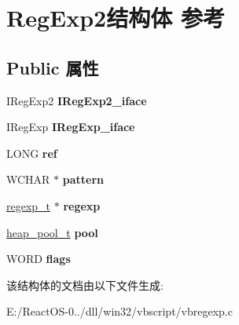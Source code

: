 \hypertarget{struct_reg_exp2}{}\section{Reg\+Exp2结构体 参考}
\label{struct_reg_exp2}
\subsection*{Public 属性}
\begin{DoxyCompactItemize}
\item 
\mbox{\label{struct_reg_exp2_aa75f3c6b1403a81130742543e5110703}} 
I\+Reg\+Exp2 {\bfseries I\+Reg\+Exp2\+\_\+iface}
\item 
\mbox{\label{struct_reg_exp2_a144fecb5ef576deb80752163f5a542f1}} 
I\+Reg\+Exp {\bfseries I\+Reg\+Exp\+\_\+iface}
\item 
\mbox{\label{struct_reg_exp2_a903fce17fc6889c5252759795ebefdb8}} 
L\+O\+NG {\bfseries ref}
\item 
\mbox{\label{struct_reg_exp2_a57ceb634b8f5d54b5cfea4410cd11c10}} 
W\+C\+H\+AR $\ast$ {\bfseries pattern}
\item 
\mbox{\label{struct_reg_exp2_a0c08adc821cc78f0614ed86a280ff0dc}} 
\hyperlink{structregexp__t}{regexp\+\_\+t} $\ast$ {\bfseries regexp}
\item 
\mbox{\label{struct_reg_exp2_acf3b6b517a94ad89f2354f9e3cfa4d93}} 
\hyperlink{structheap__pool__t}{heap\+\_\+pool\+\_\+t} {\bfseries pool}
\item 
\mbox{\label{struct_reg_exp2_a27a115857c6a9e9fab2bad5b844674b6}} 
W\+O\+RD {\bfseries flags}
\end{DoxyCompactItemize}


该结构体的文档由以下文件生成\+:\begin{DoxyCompactItemize}
\item 
E\+:/\+React\+O\+S-\/0../dll/win32/vbscript/vbregexp.\+c\end{DoxyCompactItemize}
